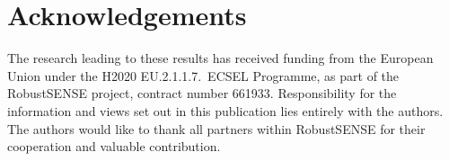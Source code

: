 \section*{Acknowledgements}

The research leading to these results has received funding 
from the European Union under the H2020 EU.2.1.1.7.\ ECSEL Programme, 
as part of the RobustSENSE project, contract number 661933.
Responsibility for the information and views 
set out in this publication lies entirely with the authors. 
The authors would like to thank all partners within RobustSENSE 
for their cooperation and valuable contribution.

